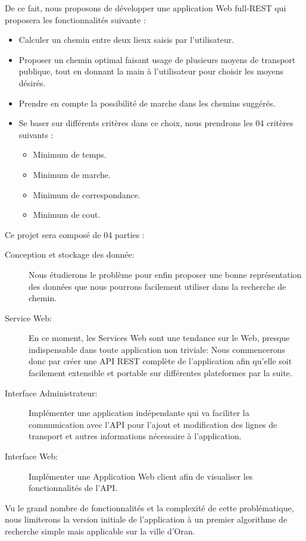 De ce fait, nous proposons de développer une application Web full-REST qui proposera les fonctionnalités suivante : 

\begin{itemize}
	\item Calculer un chemin entre deux lieux saisis par l'utilisateur.
	\item Proposer un chemin optimal faisant usage de plusieurs moyens de transport publique, tout en donnant la main à l'utilisateur pour choisir les moyens désirés.
	\item Prendre en compte la possibilité de marche dans les chemins suggérés.
	\item Se baser sur différents critères dans ce choix, nous prendrons les 04 critères suivants : 
	\begin{itemize}
		\item Minimum de temps.
		\item Minimum de marche.
		\item Minimum de correspondance.
		\item Minimum de cout.
	\end{itemize}	 
\end{itemize}

Ce projet sera composé de 04 parties :
\begin{description}
	\item[Conception et stockage des donnée: ] Nous étudierons le problème pour enfin proposer une bonne représentation des données que nous pourrons facilement utiliser dans la recherche de chemin.

	\item[Service Web: ] En ce moment, les Services Web sont une tendance sur le Web, presque indispensable dans toute application non triviale: Nous commencerons donc par créer une API REST complète de l'application afin qu'elle soit facilement extensible et portable sur différentes plateformes par la suite.
	
	\item[Interface Administrateur: ] Implémenter une application indépendante qui va faciliter la  communication avec l'API pour l'ajout et modification des lignes de transport et autres informations nécessaire à l'application.
	
	
	\item[Interface Web: ] Implémenter une Application Web client afin de visualiser les fonctionnalités de l'API.
\end{description}

Vu le grand nombre de fonctionnalités et la complexité de cette problématique, nous limiterons la version initiale de l'application à un premier algorithme de recherche simple mais applicable sur la ville d'Oran.

